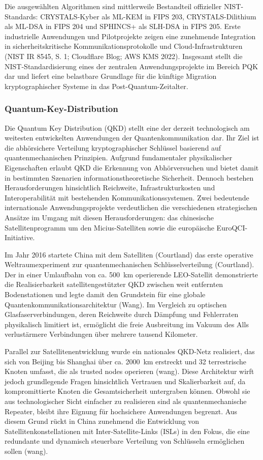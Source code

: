 Die ausgewählten Algorithmen sind mittlerweile Bestandteil offizieller NIST-Standards: CRYSTALS-Kyber als ML-KEM in FIPS 203, CRYSTALS-Dilithium als ML-DSA in FIPS 204 und SPHINCS+ als SLH-DSA in FIPS 205. Erste industrielle Anwendungen und Pilotprojekte zeigen eine zunehmende Integration in sicherheitskritische Kommunikationsprotokolle und Cloud-Infrastrukturen (NIST IR 8545, S. 1; Cloudflare Blog; AWS KMS 2022). Insgesamt stellt die NIST-Standardisierung eines der zentralen Anwendungsprojekte im Bereich PQK dar und liefert eine belastbare Grundlage für die künftige Migration kryptographischer Systeme in das Post-Quantum-Zeitalter.

\subsubsection{Quantum-Key-Distribution}

Die Quantum Key Distribution (QKD) stellt eine der derzeit technologisch am weitesten entwickelten Anwendungen der Quantenkommunikation dar. Ihr Ziel ist die abhörsichere Verteilung kryptographischer Schlüssel basierend auf quantenmechanischen Prinzipien. Aufgrund fundamentaler physikalischer Eigenschaften erlaubt QKD die Erkennung von Abhörversuchen und bietet damit in bestimmten Szenarien informationstheoretische Sicherheit. Dennoch bestehen Herausforderungen hinsichtlich Reichweite, Infrastrukturkosten und Interoperabilität mit bestehenden Kommunikationssystemen. Zwei bedeutende internationale Anwendungsprojekte verdeutlichen die verschiedenen strategischen Ansätze im Umgang mit diesen Herausforderungen: das chinesische Satellitenprogramm um den Micius-Satelliten sowie die europäische EuroQCI-Initiative.

Im Jahr 2016 startete China mit dem Satelliten (Courtland) das erste operative Weltraumexperiment zur quantenmechanischen Schlüsselverteilung (Courtland). Der in einer Umlaufbahn von ca. 500~km operierende LEO-Satellit demonstrierte die Realisierbarkeit satellitengestützter QKD zwischen weit entfernten Bodenstationen und legte damit den Grundstein für eine globale Quantenkommunikationsarchitektur (Wang). Im Vergleich zu optischen Glasfaserverbindungen, deren Reichweite durch Dämpfung und Fehlerraten physikalisch limitiert ist, ermöglicht die freie Ausbreitung im Vakuum des Alls verlustärmere Verbindungen über mehrere tausend Kilometer.

Parallel zur Satellitenentwicklung wurde ein nationales QKD-Netz realisiert, das sich von Beijing bis Shanghai über ca. 2000~km erstreckt und 32 terrestrische Knoten umfasst, die als trusted nodes operieren (wang). Diese Architektur wirft jedoch grundlegende Fragen hinsichtlich Vertrauen und Skalierbarkeit auf, da kompromittierte Knoten die Gesamtsicherheit untergraben können. Obwohl sie aus technologischer Sicht einfacher zu realisieren sind als quantenmechanische Repeater, bleibt ihre Eignung für hochsichere Anwendungen begrenzt. Aus diesem Grund rückt in China zunehmend die Entwicklung von Satellitenkonstellationen mit Inter-Satellite-Links (ISLs) in den Fokus, die eine redundante und dynamisch steuerbare Verteilung von Schlüsseln ermöglichen sollen (wang).

